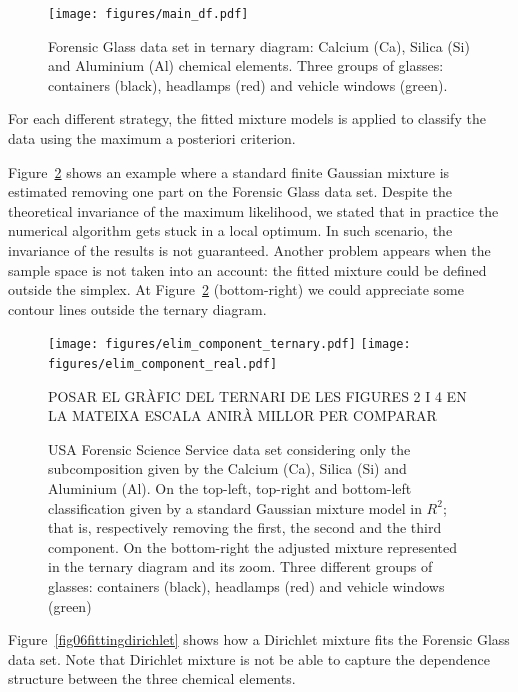 \documentclass[10pt, a4paper]{article}
\begin{document}
\begin{figure}[htbp]
\centering
\texttt{[image: figures/main\_df.pdf]}%
\caption{Forensic Glass data set in ternary diagram: Calcium (Ca), Silica (Si) and Aluminium (Al) chemical elements. Three groups of glasses: containers (black), headlamps (red) and vehicle windows (green).}
\label{fig04}
\end{figure}

For each different strategy, the fitted mixture models is applied to classify the data using the maximum a posteriori criterion.

Figure~\ref{fig05component_elimination} shows an example where a standard finite Gaussian mixture is estimated removing one part on the Forensic Glass data set. Despite the theoretical invariance of the maximum likelihood, we stated that in practice the numerical algorithm gets stuck in a local optimum. In such scenario, the invariance of the results is not guaranteed. Another problem appears when the sample space is not taken into an account: the fitted mixture could be defined outside the simplex. At Figure~\ref{fig05component_elimination} (bottom-right) we could appreciate some contour lines outside the ternary diagram.

\begin{figure}[htbp]
\centering
\texttt{[image: figures/elim\_component\_ternary.pdf]}
\texttt{[image: figures/elim\_component\_real.pdf]}



\caption{USA Forensic Science Service data set considering only the subcomposition given by the Calcium (Ca), Silica (Si) and Aluminium (Al). On the top-left, top-right and bottom-left classification given by a standard Gaussian mixture model in $R^{2}$; that is, respectively removing the first, the second and the third component. On the bottom-right the adjusted mixture represented in the ternary diagram and its zoom. Three different groups of glasses: containers (black), headlamps (red) and vehicle windows (green)} POSAR EL GR\`{A}FIC DEL TERNARI DE LES FIGURES 2 I 4 EN LA MATEIXA ESCALA ANIR\`{A} MILLOR PER COMPARAR
\label{fig05component_elimination}
\end{figure}



Figure~\ref{fig06fittingdirichlet} shows how a Dirichlet mixture fits
the Forensic Glass data set. Note that Dirichlet mixture is not be able to capture the dependence structure between the three chemical elements. 
\end{document}
